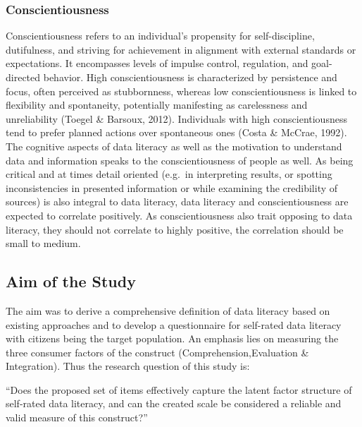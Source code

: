 \documentclass[
  12pt,
  a4paper,
  twoside]{article}
\begin{document}
\subsubsection{Conscientiousness}\label{conscientiousness}

Conscientiousness refers to an individual's propensity for
self-discipline, dutifulness, and striving for achievement in alignment
with external standards or expectations. It encompasses levels of
impulse control, regulation, and goal-directed behavior. High
conscientiousness is characterized by persistence and focus, often
perceived as stubbornness, whereas low conscientiousness is linked to
flexibility and spontaneity, potentially manifesting as carelessness and
unreliability (Toegel \& Barsoux, 2012). Individuals with high
conscientiousness tend to prefer planned actions over spontaneous ones
(Costa \& McCrae, 1992).\\
The cognitive aspects of data literacy as well as the motivation to
understand data and information speaks to the conscientiousness of
people as well. As being critical and at times detail oriented (e.g.~in
interpreting results, or spotting inconsistencies in presented
information or while examining the credibility of sources) is also
integral to data literacy, data literacy and conscientiousness are
expected to correlate positively. As conscientiousness also trait
opposing to data literacy, they should not correlate to highly positive,
the correlation should be small to medium.

\subsection{Aim of the Study}\label{aim-of-the-study}

The aim was to derive a comprehensive definition of data literacy based
on existing approaches and to develop a questionnaire for self-rated
data literacy with citizens being the target population. An emphasis
lies on measuring the three consumer factors of the construct
(Comprehension,Evaluation \& Integration). Thus the research question of
this study is:

``Does the proposed set of items effectively capture the latent factor
structure of self-rated data literacy, and can the created scale be
considered a reliable and valid measure of this construct?''
\end{document}
